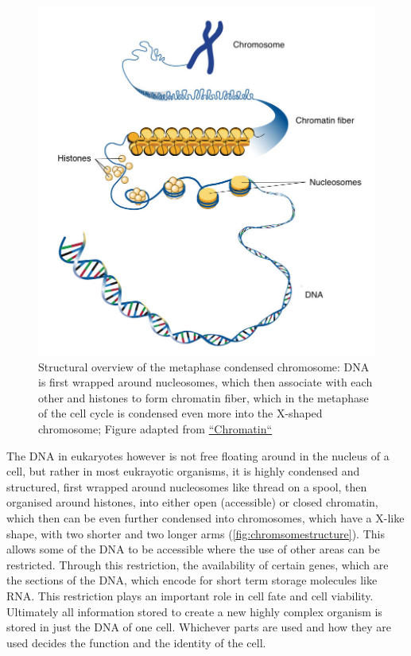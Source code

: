 \begin{figure}[!ht]
\centering
\includegraphics[width=0.9\linewidth]{Figures/ChromosomeStructure.jpg}
\caption[Overview DNA structure]{Structural overview of the metaphase condensed chromosome: DNA is first wrapped around nucleosomes, which then associate with each other and histones to form chromatin fiber, which in the metaphase of the cell cycle is condensed even more into the X-shaped chromosome; Figure adapted from \href{https://genome.gov/genetics-glossary/Chromatin}{``Chromatin``}\cite{Austin2021}}\label{fig:chromsomestructure}
\end{figure}


The DNA in eukaryotes however is not free floating around in the nucleus of a cell, but rather in most eukrayotic organisms, it is highly condensed and structured, first wrapped around nucleosomes like thread on a spool, then organised around histones, into either open (accessible) or closed chromatin, which then can be even further condensed into chromosomes, which have a X-like shape, with two shorter and two longer arms (\autoref{fig:chromsomestructure}). This allows some of the DNA to be accessible where the use of other areas can be restricted\cite{Hammond2017}. Through this restriction, the availability of certain genes, which are the sections of the DNA, which encode for short term storage molecules like RNA. This restriction plays an important role in cell fate and cell viability. Ultimately all information stored to create a new highly complex organism is stored in just the DNA of one cell. Whichever parts are used and how they are used decides the function and the identity of the cell\cite{Bonev2016}. 



